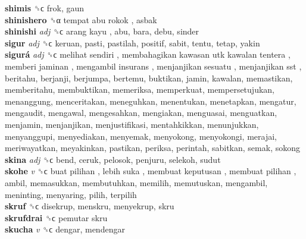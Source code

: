 \textbf{shimis} ␝ϲ  frok, gaun  \\
\textbf{shinishero} ␝α   tempat abu rokok , asbak  \\
\textbf{shinishi} \emph{adj}  ␝ϲ   arang kayu , abu, bara, debu, sinder  \\
\textbf{sigur} \emph{adj}  ␝ϲ  keruan, pasti, pastilah, positif, sabit, tentu, tetap, yakin  \\
\textbf{sigurá} \emph{adj}  ␝ϲ   melihat sendiri ,  membahagikan kawasan utk kawalan tentera ,  memberi jaminan ,  mengambil insurans ,  menjanjikan sesuatu ,  menjanjikan sst , beritahu, berjanji, berjumpa, bertemu, buktikan, jamin, kawalan, memastikan, memberitahu, membuktikan, memeriksa, memperkuat, mempersetujukan, menanggung, menceritakan, meneguhkan, menentukan, menetapkan, mengatur, mengaudit, mengawal, mengesahkan, mengiakan, menguasai, menguatkan, menjamin, menjanjikan, menjustifikasi, mentahkikkan, menunjukkan, menyanggupi, menyediakan, menyemak, menyokong, menyokongi, merajai, meriwayatkan, meyakinkan, pastikan, periksa, perintah, sabitkan, semak, sokong  \\
\textbf{skina} \emph{adj}  ␝ϲ  bend, ceruk, pelosok, penjuru, selekoh, sudut  \\
\textbf{skohe} \emph{v}  ␝ϲ   buat pilihan ,  lebih suka ,  membuat keputusan ,  membuat pilihan , ambil, memasukkan, membutuhkan, memilih, memutuskan, mengambil, meninting, menyaring, pilih, terpilih  \\
\textbf{skruf} ␝ϲ  disekrup, menskru, menyekrup, skru  \\
\textbf{skrufdrai} ␝ϲ   pemutar skru   \\
\textbf{skucha} \emph{v}  ␝ϲ  dengar, mendengar  \\
